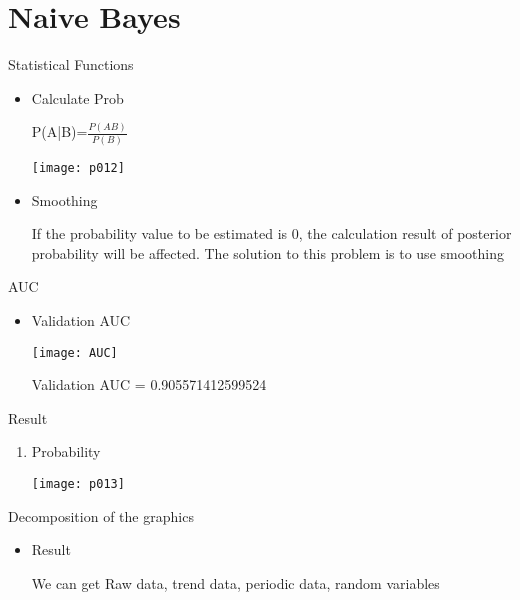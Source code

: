 \documentclass[
 size=12pt,
 paper=smartboard, %
 mode=present, %
 display=slides, %
style=tuliplab,
pauseslide,
fleqn,leqno]{powerdot}
\begin{document}
\section{Naive Bayes}


\begin{slide}{Statistical Functions}
\begin{itemize}
\item Calculate Prob
\par
P(A|B)=$\frac{P(AB)}{P(B)}$
\par
\texttt{[image: p012]}
\item Smoothing
\par
If the probability value to be estimated is 0, the calculation result of posterior probability will be affected. The solution to this problem is to use smoothing
\par

\end{itemize}
\end{slide}


\begin{slide}{AUC }
\begin{itemize}
\item Validation AUC
\par
\texttt{[image: AUC]}
\par
Validation AUC = 0.905571412599524
\par
\end{itemize}
\end{slide}


\begin{slide}{Result}
\begin{enumerate}[type=1]%
\item Probability
\par
\texttt{[image: p013]}
\end{enumerate}
\end{slide}



\begin{slide}{Decomposition of the graphics}
\begin{itemize}[type=1]
\item Result
\par
We can get Raw data, trend data, periodic data, random variables\par
\end{itemize}
\end{slide}
\end{document}
